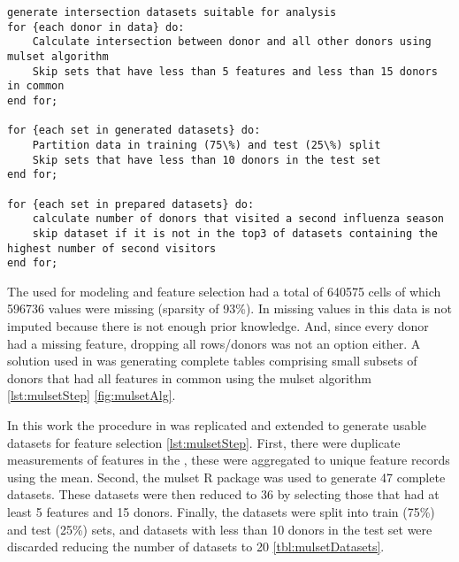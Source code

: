 \begin{minipage}{\linewidth}
\begin{lstlisting}[caption=Applying the mulset algorithm and preparing the data, label={lst:mulsetStep}]
generate intersection datasets suitable for analysis
for {each donor in data} do:
    Calculate intersection between donor and all other donors using mulset algorithm
    Skip sets that have less than 5 features and less than 15 donors in common
end for;

for {each set in generated datasets} do:
    Partition data in training (75\%) and test (25\%) split
    Skip sets that have less than 10 donors in the test set
end for;

for {each set in prepared datasets} do:
    calculate number of donors that visited a second influenza season
    skip dataset if it is not in the top3 of datasets containing the highest number of second visitors
end for;
\end{lstlisting}
\end{minipage}

The \firstvis used for modeling and feature selection had a total of 640575 cells of which 596736 values were missing (sparsity of 93\%).
In \spaper missing values in this data is not imputed because there is not enough prior knowledge.
And, since every donor had a missing feature, dropping all rows/donors was not an option either.
A solution used in \spaper was generating complete tables comprising small subsets of donors that had all features in common using the mulset algorithm \autoref{lst:mulsetStep} \autoref{fig:mulsetAlg}.

In this work the procedure in \spaper was replicated and extended to generate usable datasets for feature selection \autoref{lst:mulsetStep}.
First, there were duplicate measurements of features in the \firstvis, these were aggregated to unique feature records using the mean.
Second, the mulset R package was used to generate 47 complete datasets.
These datasets were then reduced to 36 by selecting those that had at least 5 features and 15 donors.
Finally, the datasets were split into train (75\%) and test (25\%) sets, and datasets with less than 10 donors in the test set were discarded reducing the number of datasets to 20 \autoref{tbl:mulsetDatasets}.

